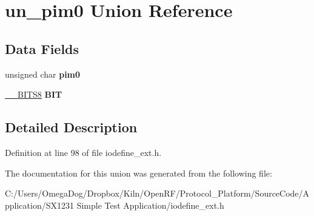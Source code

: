 \hypertarget{unionun__pim0}{\section{un\-\_\-pim0 Union Reference}
\label{unionun__pim0}
}
\subsection*{Data Fields}
\begin{DoxyCompactItemize}
\item 
\hypertarget{unionun__pim0_a02b1ddbf736540a8bcadc50384498bb6}{unsigned char {\bfseries pim0}}\label{unionun__pim0_a02b1ddbf736540a8bcadc50384498bb6}

\item 
\hypertarget{unionun__pim0_ae53c8a3cddc1a822e57e0604a4f03751}{\hyperlink{struct_____b_i_t_s8}{\-\_\-\-\_\-\-B\-I\-T\-S8} {\bfseries B\-I\-T}}\label{unionun__pim0_ae53c8a3cddc1a822e57e0604a4f03751}

\end{DoxyCompactItemize}


\subsection{Detailed Description}


Definition at line 98 of file iodefine\-\_\-ext.\-h.



The documentation for this union was generated from the following file\-:\begin{DoxyCompactItemize}
\item 
C\-:/\-Users/\-Omega\-Dog/\-Dropbox/\-Kiln/\-Open\-R\-F/\-Protocol\-\_\-\-Platform/\-Source\-Code/\-Application/\-S\-X1231 Simple Test Application/iodefine\-\_\-ext.\-h\end{DoxyCompactItemize}
